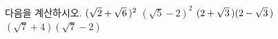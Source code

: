 다음을 계산하시오.
 $(\sqrt{2}+\sqrt{6}\mkern3mu )^2$
 $(\sqrt{5}-2)^2$
 $(2+\sqrt{3}\mkern3mu )(2-\sqrt{3}\mkern3mu )$
 $(\sqrt{7}+4)(\sqrt{7}-2)$
